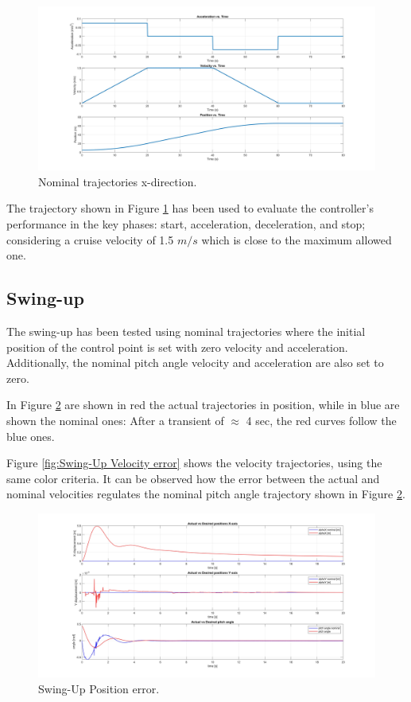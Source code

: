 \begin{figure}
    \centering
    \includegraphics[width=1\linewidth]{Images/x-trajectory/Reference_trajectories.jpg}
    \caption{Nominal trajectories x-direction.}
    \label{fig:Nominal trajectories x-direction}
\end{figure}

The trajectory shown in Figure \ref{fig:Nominal trajectories x-direction} has been used to evaluate the controller's performance in the key phases: start, acceleration, deceleration, and stop; considering a cruise velocity of 1.5 $m/s$ which is close to the maximum allowed one.

\subsection{Swing-up}
\label{subsec:Swing-up}

The swing-up has been tested using nominal trajectories where the initial position of the control point is set with zero velocity and acceleration. Additionally, the nominal pitch angle velocity and acceleration are also set to zero.

In Figure \ref{fig:Swing-Up Position error} are shown in red the actual trajectories in position, while in blue are shown the nominal ones:
After a transient of $\approx$ 4 sec, the red curves follow the blue ones.

Figure \ref{fig:Swing-Up Velocity error} shows the velocity trajectories, using the same color criteria. It can be observed how the error between the actual and nominal velocities regulates the nominal pitch angle trajectory shown in Figure \ref{fig:Swing-Up Position error}.

\begin{figure}
    \centering
    \includegraphics[width=1\linewidth]{Images/Swing-Up/Position_error.jpg}
    \caption{Swing-Up Position error.}
    \label{fig:Swing-Up Position error}
\end{figure}

